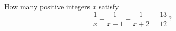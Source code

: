 How many positive integers $x$ satisfy
\[\dfrac1x+\dfrac{1}{x+1}+\dfrac{1}{x+2}=\dfrac{13}{12}\,?\]
